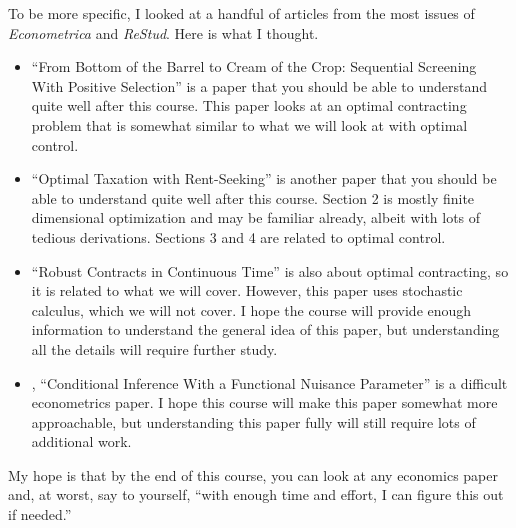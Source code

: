 \documentclass[10pt]{article}
\renewcommand{\cite}{\citet}
\begin{document}
To be more specific, I looked at a handful of articles from the most
issues of {\slshape{Econometrica}} and {\slshape{ReStud}}. Here is what I
thought. 
\begin{itemize}
\item \cite{tirole2016} ``From Bottom of the Barrel to Cream of the
  Crop: Sequential Screening With Positive Selection'' is a paper that
  you should be able to understand quite well after this course. This
  paper looks at an optimal contracting problem that is somewhat
  similar to what we will look at with optimal control. 
\item \cite{rs2016} ``Optimal Taxation with Rent-Seeking'' is another
  paper that you should be able to understand quite well after this
  course. Section 2 is mostly finite dimensional optimization and may
  be familiar already, albeit with lots of tedious
  derivations. Sections 3 and 4 are related to optimal control.
\item \cite{mr2016} ``Robust Contracts in Continuous Time'' is also
  about optimal contracting, so it is related to what we will
  cover. However, this paper uses stochastic calculus, which we will
  not cover. I hope the course will provide enough information to
  understand the general idea of this paper, but understanding all the
  details will require further study. 
\item \cite{am2016}, ``Conditional Inference With a Functional
  Nuisance Parameter'' is a difficult econometrics paper. I hope this
  course will make this paper somewhat more approachable, but
  understanding this paper fully will still require lots of additional
  work.
\end{itemize}
My hope is that by the end of this course, you can look at any
economics paper and, at worst, say to yourself, ``with enough time and
effort, I can figure this out if needed.'' 


\clearpage


\end{document}
